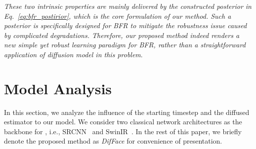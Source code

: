 \documentclass[10pt,twocolumn,letterpaper]{article}
\begin{document}
\textit{These two intrinsic properties are mainly delivered by the constructed posterior in Eq.~\eqref{eq:bfr_postirior}, which is the core formulation of our method. Such a posterior is specifically designed for BFR to mitigate the robustness issue caused by complicated degradations. Therefore, our proposed method indeed renders a new simple yet robust learning paradigm for BFR, rather than a straightforward application of diffusion model in this problem}.

\section{Model Analysis}\label{sec:model_analysis}
In this section, we analyze the influence of the starting timestep  and the diffused estimator  to our model. We consider two classical network architectures as the backbone for , i.e., SRCNN~\cite{dong2015image} and SwinIR~\cite{liang2021swinir}.
In the rest of this paper, we briefly denote the proposed method as \textit{DifFace} for convenience of presentation.
\end{document}
